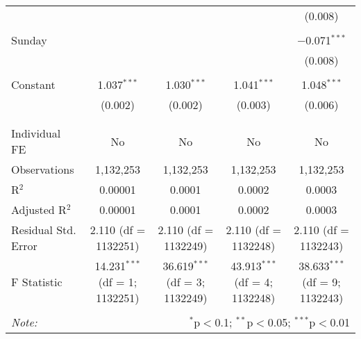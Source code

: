 \documentclass[
]{article}
\begin{document}
\begin{table}[!htbp]
{\begin{tabular}{@{\extracolsep{5pt}}lcccc}
  &  &  &  & (0.008) \\ 
  & & & & \\ 
 Sunday &  &  &  & $-$0.071$^{***}$ \\ 
  &  &  &  & (0.008) \\ 
  & & & & \\ 
 Constant & 1.037$^{***}$ & 1.030$^{***}$ & 1.041$^{***}$ & 1.048$^{***}$ \\ 
  & (0.002) & (0.002) & (0.003) & (0.006) \\ 
  & & & & \\ 
\hline \\[-1.8ex] 
Individual FE & No & No & No & No \\ 
Observations & 1,132,253 & 1,132,253 & 1,132,253 & 1,132,253 \\ 
R$^{2}$ & 0.00001 & 0.0001 & 0.0002 & 0.0003 \\ 
Adjusted R$^{2}$ & 0.00001 & 0.0001 & 0.0002 & 0.0003 \\ 
Residual Std. Error & 2.110 (df = 1132251) & 2.110 (df = 1132249) & 2.110 (df = 1132248) & 2.110 (df = 1132243) \\ 
F Statistic & 14.231$^{***}$ (df = 1; 1132251) & 36.619$^{***}$ (df = 3; 1132249) & 43.913$^{***}$ (df = 4; 1132248) & 38.633$^{***}$ (df = 9; 1132243) \\ 
\hline 
\hline \\[-1.8ex] 
\textit{Note:}  & \multicolumn{4}{r}{$^{*}$p$<$0.1; $^{**}$p$<$0.05; $^{***}$p$<$0.01} \\ 
\end{tabular}
} 
\end{table} 
\newpage
\end{document}
